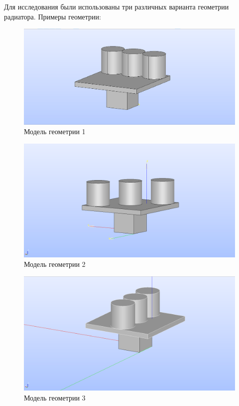 \documentclass[a4paper,12pt]{article}
\theoremstyle{plain} %
\theoremstyle{definition} %
\theoremstyle{remark} %
\begin{document}
Для исследования были использованы три различных варианта геометрии радиатора.
Примеры геометрии:
\begin{figure}[h]
	\begin{center}
		\includegraphics[width=0.5\linewidth]{1.1.png}
		\caption{Модель геометрии 1} %
	\end{center}
\end{figure}
\begin{figure}[h]
	\begin{center}
		\includegraphics[width=0.5\linewidth]{1.2.png}
		\caption{Модель геометрии 2}
	\end{center}
\end{figure}
\begin{figure}[h]
	\begin{center}
		\includegraphics[width=0.5\linewidth]{1.3.png}
		\caption{Модель геометрии 3}
	\end{center}
\end{figure}
\newpage
\end{document}
